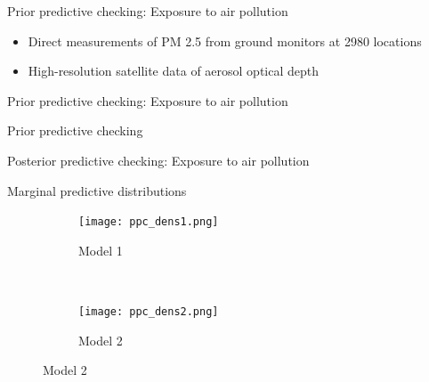 \documentclass[t]{beamer}
\begin{document}
\begin{frame}{Prior predictive checking: Exposure to air pollution}

  \begin{itemize}
  \item Direct measurements of PM 2.5 from ground monitors at 2980
    locations
  \item High-resolution satellite data of aerosol optical depth
    
  \end{itemize}
  \begin{center}
\end{center}
\end{frame}

\begin{frame}{Prior predictive checking: Exposure to air pollution}

  Prior predictive checking
  \vspace{-1\baselineskip}
  \begin{center}
\end{center}
\end{frame}

\begin{frame}{Posterior predictive checking: Exposure to air pollution}

  Marginal predictive distributions
\begin{figure}
\centering
\begin{subfigure}{0.48\textwidth}
\texttt{[image: ppc\_dens1.png]}
\caption{Model 1}
\end{subfigure}
~
\begin{subfigure}{0.48\textwidth}
\texttt{[image: ppc\_dens2.png]}
\caption{Model 2}
\end{subfigure}
\end{figure}

\end{frame}
\end{document}
